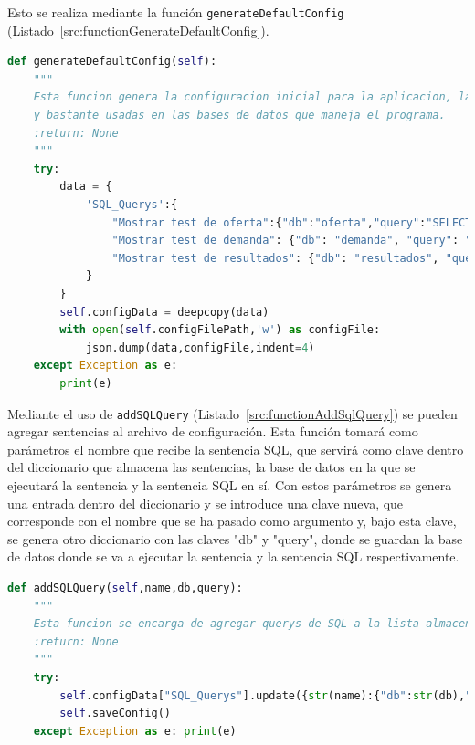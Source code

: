 Esto se realiza mediante la función \texttt{generateDefaultConfig} (Listado~\ref{src:functionGenerateDefaultConfig}).

\begin{lstlisting}[language=Python,
                   style=python,
                   frame=none,
                   numbers=none,
                   basicstyle=\ttfamily\normalsize,
                   caption={Función \texttt{generateDefaultConfig}},
                   label=src:functionGenerateDefaultConfig,
                   inputencoding=utf8]                   
def generateDefaultConfig(self):
    """
    Esta funcion genera la configuracion inicial para la aplicacion, la cual contiene querys de SQL utiles
    y bastante usadas en las bases de datos que maneja el programa.
    :return: None
    """
    try:
        data = {
            'SQL_Querys':{
                "Mostrar test de oferta":{"db":"oferta","query":"SELECT * FROM TESTS"},
                "Mostrar test de demanda": {"db": "demanda", "query": "SELECT * FROM TESTS"},
                "Mostrar test de resultados": {"db": "resultados", "query": "SELECT * FROM TESTS"}
            }
        }
        self.configData = deepcopy(data)
        with open(self.configFilePath,'w') as configFile:
            json.dump(data,configFile,indent=4)
    except Exception as e:
        print(e)
\end{lstlisting}

Mediante el uso de \texttt{addSQLQuery} (Listado~\ref{src:functionAddSqlQuery}) se pueden agregar sentencias al archivo de configuración. Esta función tomará como parámetros el nombre que recibe la sentencia \acrshort{SQL}, que servirá como clave dentro del diccionario que almacena las sentencias, la base de datos en la que se ejecutará la sentencia y la sentencia \acrshort{SQL} en sí. Con estos parámetros se genera una entrada dentro del diccionario y se introduce una clave nueva, que corresponde con el nombre que se ha pasado como argumento y, bajo esta clave, se genera otro diccionario con las claves "db" y "query", donde se guardan la base de datos donde se va a ejecutar la sentencia y la sentencia \acrshort{SQL} respectivamente.

\begin{lstlisting}[language=Python,
                   style=python,
                   frame=none,
                   numbers=none,
                   basicstyle=\ttfamily\normalsize,
                   caption={Función \texttt{addSQLQuery}},
                   label=src:functionAddSqlQuery,
                   inputencoding=utf8]                   
def addSQLQuery(self,name,db,query):
    """
    Esta funcion se encarga de agregar querys de SQL a la lista almacenada en el archivo de configuracion
    :return: None
    """
    try:
        self.configData["SQL_Querys"].update({str(name):{"db":str(db),"query":str(query)}})
        self.saveConfig()
    except Exception as e: print(e)
\end{lstlisting}

